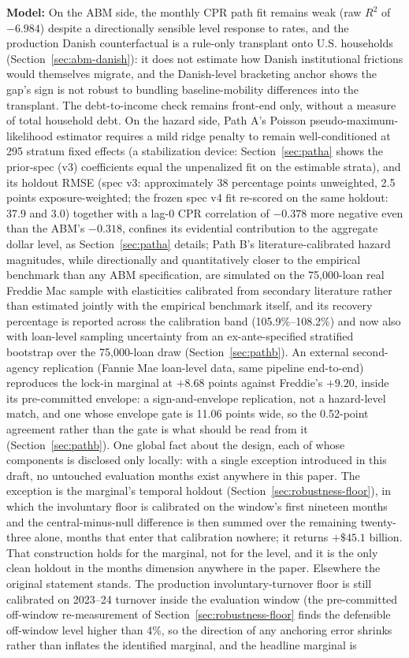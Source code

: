 \documentclass[12pt]{article}
\begin{document}
\textbf{Model:} On the ABM side, the monthly CPR path fit remains weak (raw $R^2$ of $-6.984$) despite a directionally sensible level response to rates, and the production Danish counterfactual is a rule-only transplant onto U.S. households (Section~\ref{sec:abm-danish}): it does not estimate how Danish institutional frictions would themselves migrate, and the Danish-level bracketing anchor shows the gap's sign is not robust to bundling baseline-mobility differences into the transplant. The debt-to-income check remains front-end only, without a measure of total household debt. On the hazard side, Path A's Poisson pseudo-maximum-likelihood estimator requires a mild ridge penalty to remain well-conditioned at 295 stratum fixed effects (a stabilization device: Section~\ref{sec:patha} shows the prior-spec (v3) coefficients equal the unpenalized fit on the estimable strata), and its holdout RMSE (spec v3: approximately 38 percentage points unweighted, 2.5 points exposure-weighted; the frozen spec v4 fit re-scored on the same holdout: 37.9 and 3.0) together with a lag-0 CPR correlation of $-0.378$ more negative even than the ABM's $-0.318$, confines its evidential contribution to the aggregate dollar level, as Section~\ref{sec:patha} details; Path B's literature-calibrated hazard magnitudes, while directionally and quantitatively closer to the empirical benchmark than any ABM specification, are simulated on the 75,000-loan real Freddie Mac sample with elasticities calibrated from secondary literature rather than estimated jointly with the empirical benchmark itself, and its recovery percentage is reported across the calibration band (105.9\%--108.2\%) and now also with loan-level sampling uncertainty from an ex-ante-specified stratified bootstrap over the 75,000-loan draw (Section~\ref{sec:pathb}). An external second-agency replication (Fannie Mae loan-level data, same pipeline end-to-end) reproduces the lock-in marginal at $+8.68$ points against Freddie's $+9.20$, inside its pre-committed envelope: a sign-and-envelope replication, not a hazard-level match, and one whose envelope gate is 11.06 points wide, so the 0.52-point agreement rather than the gate is what should be read from it (Section~\ref{sec:pathb}). One global fact about the design, each of whose components is disclosed only locally: with a single exception introduced in this draft, no untouched evaluation months exist anywhere in this paper. The exception is the marginal's temporal holdout (Section~\ref{sec:robustness-floor}), in which the involuntary floor is calibrated on the window's first nineteen months and the central-minus-null difference is then summed over the remaining twenty-three alone, months that enter that calibration nowhere; it returns $+\$45.1$ billion. That construction holds for the marginal, not for the level, and it is the only clean holdout in the months dimension anywhere in the paper. Elsewhere the original statement stands. The production involuntary-turnover floor is still calibrated on 2023--24 turnover inside the evaluation window (the pre-committed off-window re-measurement of Section~\ref{sec:robustness-floor} finds the defensible off-window level higher than 4\%, so the direction of any anchoring error shrinks rather than inflates the identified marginal, and the headline marginal is 
\end{document}
